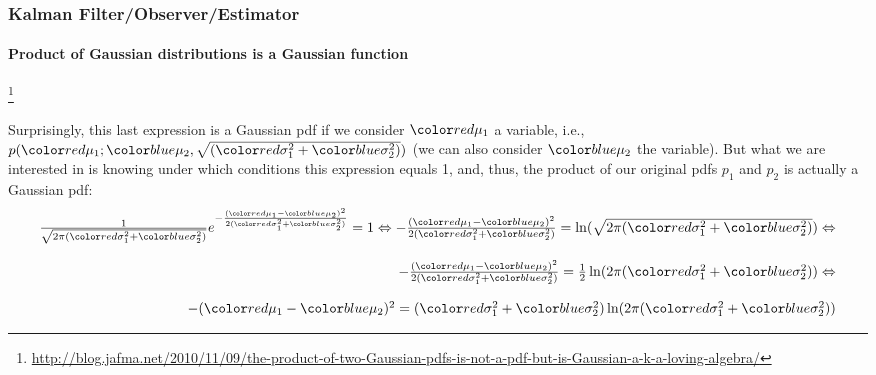 \documentclass{beamer}
\newenvironment{changemargin}[2]
	{
	  	\begin{list}{}
		{
			\setlength{\topsep}{0pt}%
			\setlength{\leftmargin}{#1}%
			\setlength{\rightmargin}{#2}%
			\setlength{\listparindent}{\parindent}%
			\setlength{\itemindent}{\parindent}%
			\setlength{\parsep}{\parskip}%
		}
	  	\item[]
		}
		{\end{list}
	}
\begin{document}
\begin{frame}[plain]
\frametitle{Kalman Filter/Observer/Estimator}
\framesubtitle{Product of Gaussian distributions is a Gaussian function}

\footnote{\tiny\hspace{-0.23in} \hspace{-0.25in}
\href{http://blog.jafma.net/2010/11/09/the-product-of-two-Gaussian-pdfs-is-not-a-pdf-but-is-Gaussian-a-k-a-loving-algebra/}{http://blog.jafma.net/2010/11/09/the-product-of-two-Gaussian-pdfs-is-not-a-pdf-but-is-Gaussian-a-k-a-loving-algebra/}}
\begin{changemargin}{-1.35in}{0in}
\scriptsize
Surprisingly, this last expression is a Gaussian pdf if we consider $\muone$ a variable, i.e., $p(\muone; \mutwo, \sqrt{(\varone+\vartwo)})$ (we can also consider $\mutwo$ the variable). But what we are interested in is knowing under which conditions this expression equals 1, and, thus, the product of our original pdfs $p_1$ and $p_2$ is actually a Gaussian pdf:
\begin{equation*}
\begin{array}{rlllllll}
\frac {1}{ \sqrt{2 \pi (\varone + \vartwo)} }   e^{- \frac { ({\muone} - {\mutwo} )^2 }{ 2(\varone + \vartwo) } } = 1  \Leftrightarrow    - \frac { ({\muone} - {\mutwo} )^2 }{ 2(\varone + \vartwo) }   = \ln ( \sqrt{2 \pi (\varone + \vartwo)} )  \Leftrightarrow\\\\
- \frac { ({\muone} - {\mutwo} )^2 }{ 2(\varone + \vartwo) }   = \frac {1}{2} \ln ( 2 \pi (\varone + \vartwo) )  \Leftrightarrow\\\\
-  ({\muone} - {\mutwo} )^2    = (\varone + \vartwo) \ln ( 2 \pi (\varone + \vartwo) ) 
\end{array}
\end{equation*}
\end{changemargin}
\end{frame}
\end{document}
